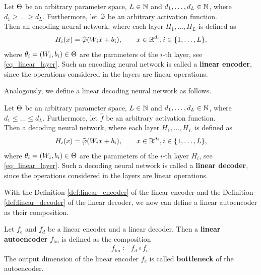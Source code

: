 \begin{definition}\label{def:linear_encoder}
Let $\operatorname{\Theta}$ be an arbitrary parameter space, $L\in \operatorname{\mathbb{N}}$ and $d_1,\ldots,d_L \in \operatorname{\mathbb{N}}$, where $d_1\geq \ldots \geq d_L$. Furthermore, let $\widehat{\operatorname{\varphi}}$ be an arbitrary activation function.\\
Then an encoding neural network, where each layer $H_1,\ldots, H_L$ is defined as
\begin{align*}
H_i(x) = \widehat{\operatorname{\varphi}}(W_ix + b_i), \qquad x \in \operatorname{\mathbb{R}}^{d_i}, i \in \{1,\ldots, L\},
\end{align*}
where $\theta_i = (W_i, b_i)\in\operatorname{\Theta}$ are the parameters of the $i$-th layer, see \eqref{eq_linear_layer}. Such an encoding neural network is called a \textbf{linear encoder}, since the operations considered in the layers are linear operations.
\end{definition}

Analogously, we define a linear decoding neural network as follows.

\begin{definition}\label{def:linear_decoder}
Let $\operatorname{\Theta}$ be an arbitrary parameter space, $L\in \operatorname{\mathbb{N}}$ and $d_1,\ldots,d_L \in \operatorname{\mathbb{N}}$, where $d_1\leq \ldots \leq d_L$. Furthermore, let $\hat{f}$ be an arbitrary activation function.\\
Then a decoding neural network, where each layer $H_1,\ldots, H_L$ is defined as
\begin{align*}
H_i(x) = \widehat{\operatorname{\varphi}}(W_ix + b_i), \qquad x \in \operatorname{\mathbb{R}}^{d_i}, i \in \{1,\ldots, L\},
\end{align*}
where $\theta_i=(W_i, b_i)\in\operatorname{\Theta}$ are the parameters of the $i$-th layer $H_i$, see \eqref{eq_linear_layer}. Such a decoding neural network is called a \textbf{linear decoder}, since the operations considered in the layers are linear operations.
\end{definition}

With the Definition \ref{def:linear_encoder} of the linear encoder and the Definition \ref{def:linear_decoder} of the linear decoder, we now can define a linear autoencoder as their composition.

\begin{definition}
Let $f_e$ and $f_d$ be a linear encoder and a linear decoder. Then a \textbf{linear autoencoder} $f_{\text{lin}}$ is defined as the composition
\begin{align*}
f_{\text{lin}} \coloneqq f_d \circ f_e.
\end{align*}
The output dimension of the linear encoder $f_e$ is called \textbf{bottleneck} of the autoencoder.
\end{definition}

